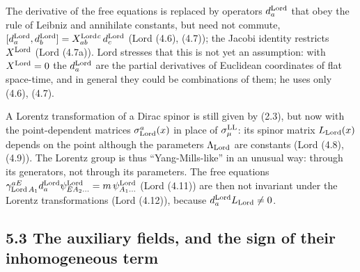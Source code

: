 \documentclass[
  10pt,
]{article}
\begin{document}
The derivative of the free equations is replaced by operators
\(d^{\rm Lord}_a\) that obey the rule of Leibniz and annihilate
constants, but need not commute,
\([d^{\rm Lord}_a,d^{\rm Lord}_b]=X^{\rm Lord}_{ab}{}^c\,d^{\rm Lord}_c\)
(Lord (4.6), (4.7)); the Jacobi identity restricts \(X^{\rm Lord}\)
(Lord (4.7a)). Lord stresses that this is not yet an assumption: with
\(X^{\rm Lord}=0\) the \(d^{\rm Lord}_a\) are the partial derivatives of
Euclidean coordinates of flat space-time, and in general they could be
combinations of them; he uses only (4.6), (4.7).

A Lorentz transformation of a Dirac spinor is still given by (2.3), but
now with the point-dependent matrices \(\sigma^a_{\rm Lord}(x)\) in
place of \(\sigma^{\rm LL}_\mu\): its spinor matrix \(L_{\rm Lord}(x)\)
depends on the point although the parameters \(\Lambda_{\rm Lord}\) are
constants (Lord (4.8), (4.9)). The Lorentz group is thus
``Yang-Mills-like'' in an unusual way: through its generators, not
through its parameters. The free equations
\(\gamma^{aE}_{{\rm Lord}\,A_1}d^{\rm Lord}_a\psi^{\rm Lord}_{EA_2\dots}=m\,\psi^{\rm Lord}_{A_1\dots}\)
(Lord (4.11)) are then not invariant under the Lorentz transformations
(Lord (4.12)), because \(d^{\rm Lord}_aL_{\rm Lord}\neq0\).

\hypertarget{the-auxiliary-fields-and-the-sign-of-their-inhomogeneous-term}{%
\subsection{5.3 The auxiliary fields, and the sign of their
inhomogeneous
term}\label{the-auxiliary-fields-and-the-sign-of-their-inhomogeneous-term}}
\end{document}
